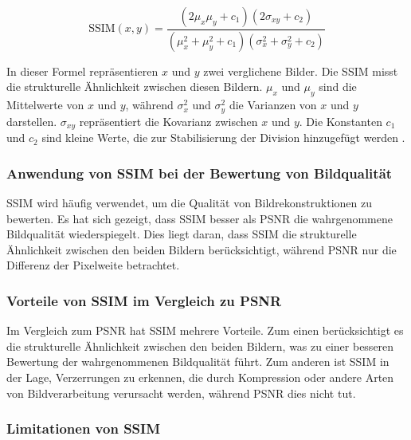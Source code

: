         \begin{equation}
            \text{SSIM}(x, y) = \frac{{(2\mu_x\mu_y + c_1)(2\sigma_{xy} + c_2)}}{{(\mu_x^2 + \mu_y^2 + c_1)(\sigma_x^2 + \sigma_y^2 + c_2)}}
        \end{equation}

        In dieser Formel repräsentieren \(x\) und \(y\) zwei verglichene Bilder.
        Die \ac{SSIM} misst die strukturelle Ähnlichkeit zwischen diesen Bildern.
        \(\mu_x\) und \(\mu_y\) sind die Mittelwerte von \(x\) und \(y\), während \(\sigma_x^2\) und \(\sigma_y^2\) die Varianzen von \(x\) und \(y\) darstellen.
        \(\sigma_{xy}\) repräsentiert die Kovarianz zwischen \(x\) und \(y\).
        Die Konstanten \(c_1\) und \(c_2\) sind kleine Werte, die zur Stabilisierung der Division hinzugefügt werden
        .

        
        \subsubsection{Anwendung von SSIM bei der Bewertung von Bildqualität}
        
            \ac{SSIM} wird häufig verwendet, um die Qualität von Bildrekonstruktionen zu bewerten. Es hat sich gezeigt, dass \ac{SSIM} besser als PSNR die wahrgenommene Bildqualität wiederspiegelt. 
            Dies liegt daran, dass \ac{SSIM} die strukturelle Ähnlichkeit zwischen den beiden Bildern berücksichtigt, während \ac{PSNR} nur die Differenz der Pixelweite betrachtet.

        \subsubsection{Vorteile von SSIM im Vergleich zu PSNR}
        
            Im Vergleich zum \ac{PSNR} hat \ac{SSIM} mehrere Vorteile. Zum einen berücksichtigt es die strukturelle Ähnlichkeit zwischen den beiden Bildern, was zu einer besseren Bewertung der wahrgenommenen Bildqualität führt. 
            Zum anderen ist \ac{SSIM} in der Lage, Verzerrungen zu erkennen, die durch Kompression oder andere Arten von Bildverarbeitung verursacht werden, während \ac{PSNR} dies nicht tut.
        
        \subsubsection{Limitationen von SSIM}
        
